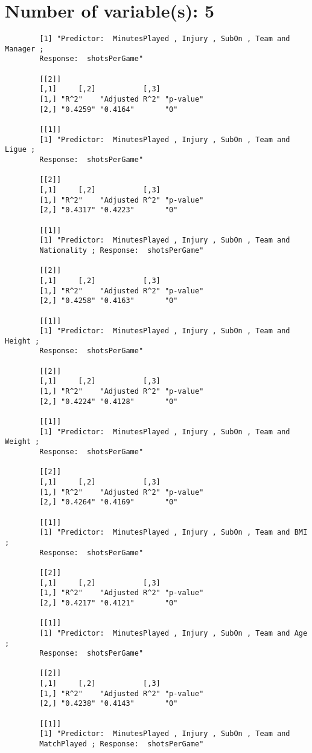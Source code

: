 \documentclass[12pt]{article}
\begin{document}
	\section{Number of variable(s): 5}
	\begin{verbatim}
		[1] "Predictor:  MinutesPlayed , Injury , SubOn , Team and Manager ; 
		Response:  shotsPerGame"
		
		[[2]]
		[,1]     [,2]           [,3]     
		[1,] "R^2"    "Adjusted R^2" "p-value"
		[2,] "0.4259" "0.4164"       "0"      
		
		[[1]]
		[1] "Predictor:  MinutesPlayed , Injury , SubOn , Team and Ligue ; 
		Response:  shotsPerGame"
		
		[[2]]
		[,1]     [,2]           [,3]     
		[1,] "R^2"    "Adjusted R^2" "p-value"
		[2,] "0.4317" "0.4223"       "0"      
		
		[[1]]
		[1] "Predictor:  MinutesPlayed , Injury , SubOn , Team and 
		Nationality ; Response:  shotsPerGame"
		
		[[2]]
		[,1]     [,2]           [,3]     
		[1,] "R^2"    "Adjusted R^2" "p-value"
		[2,] "0.4258" "0.4163"       "0"      
		
		[[1]]
		[1] "Predictor:  MinutesPlayed , Injury , SubOn , Team and Height ; 
		Response:  shotsPerGame"
		
		[[2]]
		[,1]     [,2]           [,3]     
		[1,] "R^2"    "Adjusted R^2" "p-value"
		[2,] "0.4224" "0.4128"       "0"      
		
		[[1]]
		[1] "Predictor:  MinutesPlayed , Injury , SubOn , Team and Weight ; 
		Response:  shotsPerGame"
		
		[[2]]
		[,1]     [,2]           [,3]     
		[1,] "R^2"    "Adjusted R^2" "p-value"
		[2,] "0.4264" "0.4169"       "0"      
		
		[[1]]
		[1] "Predictor:  MinutesPlayed , Injury , SubOn , Team and BMI ; 
		Response:  shotsPerGame"
		
		[[2]]
		[,1]     [,2]           [,3]     
		[1,] "R^2"    "Adjusted R^2" "p-value"
		[2,] "0.4217" "0.4121"       "0"      
		
		[[1]]
		[1] "Predictor:  MinutesPlayed , Injury , SubOn , Team and Age ; 
		Response:  shotsPerGame"
		
		[[2]]
		[,1]     [,2]           [,3]     
		[1,] "R^2"    "Adjusted R^2" "p-value"
		[2,] "0.4238" "0.4143"       "0"      
		
		[[1]]
		[1] "Predictor:  MinutesPlayed , Injury , SubOn , Team and 
		MatchPlayed ; Response:  shotsPerGame"
		

\end{verbatim}
\end{document}
